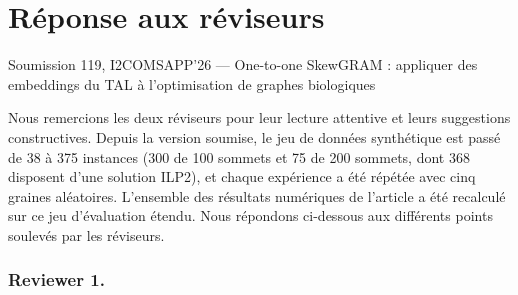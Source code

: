 \section*{Réponse aux réviseurs}
\noindent Soumission 119, I2COMSAPP'26 --- \og One-to-one SkewGRAM : appliquer des embeddings du TAL à l'optimisation de graphes biologiques \fg
\medskip

Nous remercions les deux réviseurs pour leur lecture attentive et leurs suggestions constructives. Depuis la version soumise, le jeu de données synthétique est passé de 38 à 375 instances (300 de 100 sommets et 75 de 200 sommets, dont 368 disposent d'une solution ILP2), et chaque expérience a été répétée avec cinq graines aléatoires. L'ensemble des résultats numériques de l'article a été recalculé sur ce jeu d'évaluation étendu. Nous répondons ci-dessous aux différents points soulevés par les réviseurs.

\subsubsection{Reviewer 1.}

